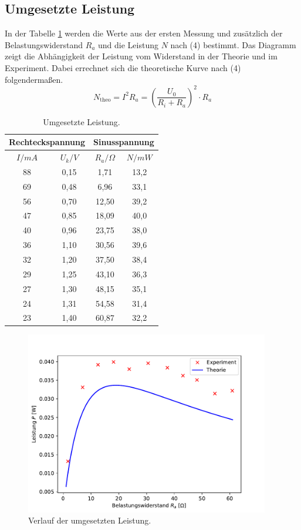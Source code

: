 \subsection{Umgesetzte Leistung}
In der Tabelle \ref{tab:e} werden die Werte aus der ersten Messung und zusätzlich der Belastungswiderstand $R_a$ und die Leistung $N$ nach (4) bestimmt.
Das Diagramm zeigt die Abhängigkeit der Leistung vom Widerstand in der Theorie und im Experiment.
Dabei errechnet sich die theoretische Kurve nach (4) folgendermaßen.
\begin{equation}
    N_\text{theo} = I^{2} R_a = \left (\frac{U_0}{R_i+R_a} \right )^{2} \cdot R_a
\end{equation}
\begin{table}[h!]
    \begin{center}
      \caption{Umgesetzte Leistung.}
      \label{tab:e}
      \begin{tabular}{c|c|c|c} 
        \multicolumn{2}{c|}{Rechteckspannung} & \multicolumn{2}{c}{Sinusspannung} \\
        \hline
        \textbf{$I / mA$} & \textbf{$U_k / V$} & \textbf{$R_a / \Omega$} &  \textbf{$N / mW$}\\
        \hline
		88 & 0,15 & 1,71 & 13,2\\
		69 & 0,48 & 6,96 & 33,1\\
		56 & 0,70 & 12,50 & 39,2\\
		47 & 0,85 & 18,09 & 40,0\\
		40 & 0,96 & 23,75 & 38,0\\
		36 & 1,10 & 30,56 & 39,6\\
		32 & 1,20 & 37,50 & 38,4\\
		29 & 1,25 & 43,10 & 36,3\\
		27 & 1,30 & 48,15 & 35,1\\
		24 & 1,31 & 54,58 & 31,4\\
		23 & 1,40 & 60,87 & 32,2\\
      \end{tabular}
    \end{center}
\end{table}

\begin{figure}[h!]
  \centering
  \includegraphics[height=8cm]{Auswertung/Leistung.pdf}
  \caption{Verlauf der umgesetzten Leistung.}
  \label{fig:Leistung.pdf}
\end{figure}

\newpage
